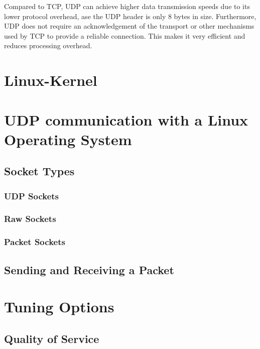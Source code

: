 Compared to TCP, UDP can achieve higher data transmission speeds due to its lower protocol overhead, ase the UDP header is only 8 bytes in size. Furthermore, UDP does not require an acknowledgement of the transport or other mechanisms used by TCP to provide a reliable connection. This makes it very efficient and reduces processing overhead.



\section{Linux-Kernel}






\section{UDP communication with a Linux Operating System}

\subsection{Socket Types}


\subsubsection{UDP Sockets}


\subsubsection{Raw Sockets}


\subsubsection{Packet Sockets}


\subsection{Sending and Receiving a Packet}


\section{Tuning Options}

\subsection{Quality of Service} \label{background:tuning:qualityofservice}


